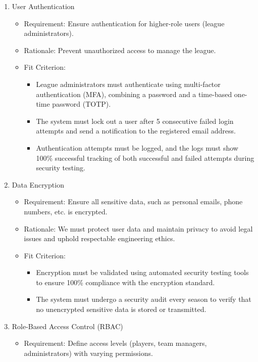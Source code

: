 \documentclass{article}
\begin{document}
\begin{enumerate}
    \item User Authentication
        \begin{itemize}
            \item Requirement: Ensure authentication for higher-role users (league administrators).
            \item Rationale: Prevent unauthorized access to manage the league.
            \item Fit Criterion:
            \begin{itemize}
                \item League administrators must authenticate using multi-factor authentication (MFA), combining a password and a time-based one-time password (TOTP).
                \item The system must lock out a user after 5 consecutive failed login attempts and send a notification to the registered email address.
                \item Authentication attempts must be logged, and the logs must show 100\% successful tracking of both successful and failed attempts during security testing.
            \end{itemize}
        \end{itemize}
    \item Data Encryption
        \begin{itemize}
            \item Requirement: Ensure all sensitive data, such as personal emails, phone numbers, etc. is encrypted.
            \item Rationale: We must protect user data and maintain privacy to avoid legal issues and uphold respectable engineering ethics.
            \item Fit Criterion:
            \begin{itemize}
                \item Encryption must be validated using automated security testing tools to ensure 100\% compliance with the encryption standard.
                \item The system must undergo a security audit every season to verify that no unencrypted sensitive data is stored or transmitted.
            \end{itemize}
        \end{itemize}
    \item Role-Based Access Control (RBAC)
        \begin{itemize}
            \item Requirement: Define access levels (players, team managers, administrators) with varying permissions.

\end{itemize}
\end{enumerate}
\end{document}
